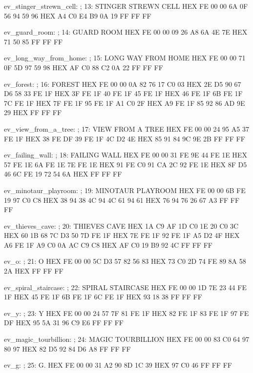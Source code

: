 \documentclass[10pt]{report}
\begin{document}
ev_stinger_strewn_cell:                 ; 13: STINGER STREWN CELL
    HEX FE 00 00 6A 0F 56 94 59 96
    HEX A4 C0 E4 B9 0A 19 FF FF FF

ev_guard_room:                          ; 14: GUARD ROOM
    HEX FE 00 00 09 26 A8 6A 4E 7E
    HEX 71 50 85 FF FF FF

ev_long_way_from_home:                  ; 15: LONG WAY FROM HOME
    HEX FE 00 00 71 0F 5D 97 59 98
    HEX AF C0 88 C2 0A 22 FF FF FF

ev_forest:                              ; 16: FOREST
    HEX FE 00 00 0A 82 76 17 C0 03
    HEX 2E D5 90 67 D6 58 33 FE 1F
    HEX 3F FE 1F 40 FE 1F 45 FE 1F
    HEX 46 FE 1F 6B FE 1F 7C FE 1F
    HEX 7F FE 1F 95 FE 1F A1 C0 2F
    HEX A9 FE 1F 85 92 86 AD 9E 29
    HEX FF FF FF

ev_view_from_a_tree:                    ; 17: VIEW FROM A TREE
    HEX FE 00 00 24 95 A5 37 FE 1F
    HEX 38 FE DF 39 FE 1F 4C D2 4E
    HEX 85 91 84 9C 9E 2B FF FF FF

ev_failing_wall:                        ; 18: FAILING WALL
    HEX FE 00 00 31 FE 9E 44 FE 1E
    HEX 57 FE 1E 6A FE 1E 7E FE 1E
    HEX 91 FE C0 91 CA 2C 92 FE 1E
    HEX 8F D5 46 6C FE 19 72 54 6A
    HEX FF FF FF

ev_minotaur_playroom:                   ; 19: MINOTAUR PLAYROOM
    HEX FE 00 00 6B FE 19 97 C0 C8
    HEX 38 94 38 4C 94 4C 61 94 61
    HEX 76 94 76 26 67 A3 FF FF FF

ev_thieves_cave:                        ; 20: THIEVES CAVE
    HEX 1A C9 AF 1D C0 1E 20 C0 3C
    HEX 60 1B 68 7C D3 50 7D FE 1F
    HEX 7E FE 1F 92 FE 1F A5 D2 4F
    HEX A6 FE 1F A9 C0 0A AC C9 C8
    HEX AF C0 19 B9 92 4C FF FF FF

ev_o:                                   ; 21: O
    HEX FE 00 00 5C D3 57 82 56 83
    HEX 73 C0 2D 74 FE 89 8A 58 2A
    HEX FF FF FF

ev_spiral_staircase:                    ; 22: SPIRAL STAIRCASE
    HEX FE 00 00 1D 7E 23 44 FE 1F
    HEX 45 FE 1F 6B FE 1F 6C FE 1F
    HEX 93 18 38 FF FF FF

ev_y:                                   ; 23: Y
    HEX FE 00 00 24 57 7F 81 FE 1F
    HEX 82 FE 1F 83 FE 1F 97 FE DF
    HEX 95 5A 31 96 C9 E6 FF FF FF

ev_magic_tourbillion:                   ; 24: MAGIC TOURBILLION
    HEX FE 00 00 83 C0 64 97 80 97
    HEX 82 D5 92 84 D6 A8 FF FF FF

ev_g:                                   ; 25: G.
    HEX FE 00 00 31 A2 90 8D 1C 39
    HEX 97 C0 46 FF FF FF
\end{document}
